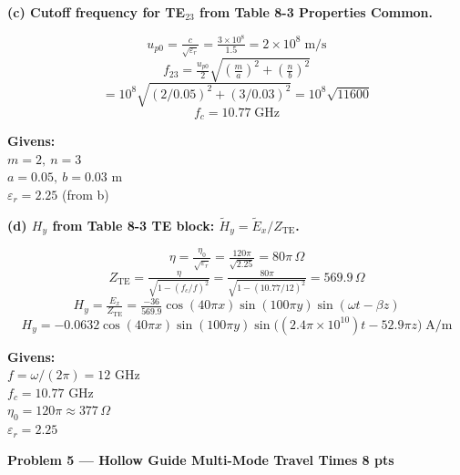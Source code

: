 \documentclass[11pt,letterpaper]{article}
\newcommand{\probhead}[2]{%
  \colorbox{purplebg}{\parbox{\dimexpr\linewidth-2\fboxsep}%
  {\color{purple}\large\textbf{Problem #1 \hfill #2}}}}
\begin{document}
\textbf{(c) Cutoff frequency for TE$_{23}$ from Table 8-3 Properties Common.}

\begin{minipage}[t]{0.55\linewidth}\vspace{0pt}
\[u_{p0} = \tfrac{c}{\sqrt{\varepsilon_r}} = \tfrac{3{\times}10^8}{1.5} = 2{\times}10^8\;\text{m/s}\]
\[f_{23} = \tfrac{u_{p0}}{2}\sqrt{\!\left(\tfrac{m}{a}\right)^{\!2}\!+\!\left(\tfrac{n}{b}\right)^{\!2}}\]
\[= 10^8\sqrt{(2/0.05)^2 + (3/0.03)^2} = 10^8\sqrt{11600}\]
\[\boxed{f_c = 10.77\;\text{GHz}}\]
\end{minipage}\hfill
\begin{minipage}[t]{0.42\linewidth}\vspace{0pt}
\begin{givens}
\textbf{Givens:}\\
$m = 2,\ n = 3$\\
$a = 0.05,\ b = 0.03$ m\\
$\varepsilon_r = 2.25$ (from b)
\end{givens}
\end{minipage}

\textbf{(d) $H_y$ from Table 8-3 TE block: $\tilde{H}_y = \tilde{E}_x/Z_\text{TE}$.}

\begin{minipage}[t]{0.55\linewidth}\vspace{0pt}
\[\eta = \tfrac{\eta_0}{\sqrt{\varepsilon_r}} = \tfrac{120\pi}{\sqrt{2.25}} = 80\pi\,\Omega\]
\[Z_\text{TE} = \tfrac{\eta}{\sqrt{1-(f_c/f)^2}} = \tfrac{80\pi}{\sqrt{1-(10.77/12)^2}} = 569.9\,\Omega\]
\[H_y = \tfrac{E_x}{Z_\text{TE}} = \tfrac{-36}{569.9}\cos(40\pi x)\sin(100\pi y)\sin(\omega t-\beta z)\]
\[\boxed{H_y = -0.0632\cos(40\pi x)\sin(100\pi y)\sin\!\big((2.4\pi{\times}10^{10})t-52.9\pi z\big)\;\text{A/m}}\]
\end{minipage}\hfill
\begin{minipage}[t]{0.42\linewidth}\vspace{0pt}
\begin{givens}
\textbf{Givens:}\\
$f = \omega/(2\pi) = 12$ GHz\\
$f_c = 10.77$ GHz\\
$\eta_0 = 120\pi \approx 377\,\Omega$\\
$\varepsilon_r = 2.25$
\end{givens}
\end{minipage}

\newpage
\probhead{5 --- Hollow Guide Multi-Mode Travel Times}{8 pts}
\end{document}
